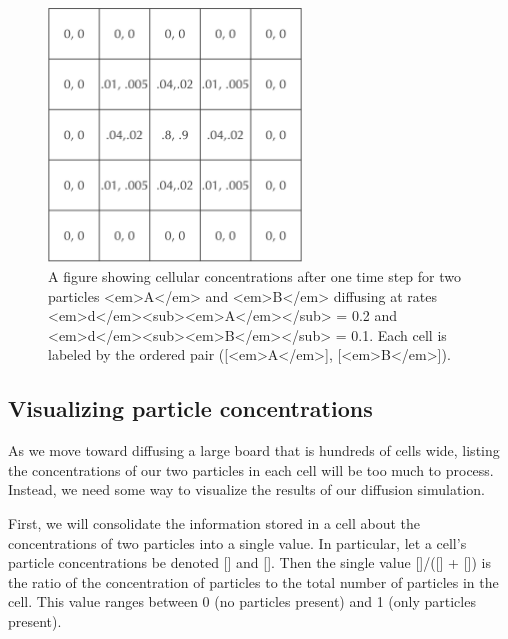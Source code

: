 {{\begin{figure}[h]
\centering
\mySfFamily
\includegraphics[width = 0.6\textwidth]{../images/two_particle_concentration_diffusion.png}
\caption{A figure showing cellular concentrations after one time step for two particles <em>A</em> and <em>B</em> diffusing at rates <em>d</em><sub><em>A</em></sub> = 0.2 and <em>d</em><sub><em>B</em></sub> = 0.1. Each cell is labeled by the ordered pair ([<em>A</em>], [<em>B</em>]).}
\label{fig:two_particle_concentration_diffusion}
\end{figure}

\begin{qbox}[%
Update the cells in the above figure after another generation of diffusion. Use the diffusion rates <em>d</em><sub><em>A</em></sub> = 0.2 and <em>d</em><sub><em>B</em></sub> = 0.1.
]\end{qbox}

\FloatBarrier
{}
\subsection{Visualizing particle concentrations}

As we move toward diffusing a large board that is hundreds of cells wide, listing the concentrations of our two particles in each cell will be too much to process. Instead, we need some way to visualize the results of our diffusion simulation.

First, we will consolidate the information stored in a cell about the concentrations of two particles into a single value. In particular, let a cell's particle concentrations be denoted [] and []. Then the single value []/([] + []) is the ratio of the concentration of  particles to the total number of particles in the cell. This value ranges between 0 (no  particles present) and 1 (only  particles present).

}}
